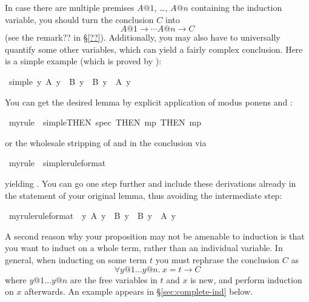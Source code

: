 \begin{isabellebody}
\begin{isamarkuptext}
In case there are multiple premises $A@1$, \dots, $A@n$ containing the
induction variable, you should turn the conclusion $C$ into
\[ A@1 \longrightarrow \cdots A@n \longrightarrow C \]
(see the remark?? in \S\ref{??}).
Additionally, you may also have to universally quantify some other variables,
which can yield a fairly complex conclusion.
Here is a simple example (which is proved by ):%
\end{isamarkuptext}%
\ simple{\isacharcolon}\ {\isachardoublequote}{\isasymforall}y{\isachardot}\ A\ y\ {\isasymlongrightarrow}\ B\ y\ {\isasymlongrightarrow}\ B\ y\ {\isasymand}\ A\ y{\isachardoublequote}%
\begin{isamarkuptext}%
\noindent
You can get the desired lemma by explicit
application of modus ponens and :%
\end{isamarkuptext}%
\ myrule\ {\isacharequal}\ simple{\isacharbrackleft}THEN\ spec{\isacharcomma}\ THEN\ mp{\isacharcomma}\ THEN\ mp{\isacharbrackright}%
\begin{isamarkuptext}%
\noindent
or the wholesale stripping of \isa{{\isasymforall}} and
\isa{{\isasymlongrightarrow}} in the conclusion via %
\end{isamarkuptext}%
\ myrule\ {\isacharequal}\ simple{\isacharbrackleft}rule{\isacharunderscore}format{\isacharbrackright}%
\begin{isamarkuptext}%
\noindent
yielding .
You can go one step further and include these derivations already in the
statement of your original lemma, thus avoiding the intermediate step:%
\end{isamarkuptext}%
\ myrule{\isacharbrackleft}rule{\isacharunderscore}format{\isacharbrackright}{\isacharcolon}\ \ {\isachardoublequote}{\isasymforall}y{\isachardot}\ A\ y\ {\isasymlongrightarrow}\ B\ y\ {\isasymlongrightarrow}\ B\ y\ {\isasymand}\ A\ y{\isachardoublequote}%
\begin{isamarkuptext}%
\bigskip

A second reason why your proposition may not be amenable to induction is that
you want to induct on a whole term, rather than an individual variable. In
general, when inducting on some term $t$ you must rephrase the conclusion $C$
as
\[ \forall y@1 \dots y@n.~ x = t \longrightarrow C \]
where $y@1 \dots y@n$ are the free variables in $t$ and $x$ is new, and
perform induction on $x$ afterwards. An example appears in
\S\ref{sec:complete-ind} below.


\end{isamarkuptext}
\end{isabellebody}
